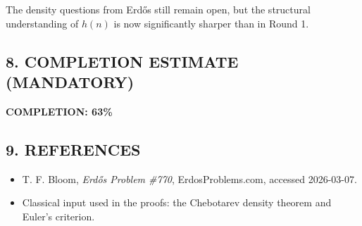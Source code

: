 The density questions from Erd\H{o}s still remain open, but the structural understanding of $h(n)$ is now significantly sharper than in Round 1.

\subsection*{8. COMPLETION ESTIMATE (MANDATORY)}

\textbf{COMPLETION: 63\%}

\subsection*{9. REFERENCES}

\begin{itemize}
\item T. F. Bloom, \emph{Erd\H{o}s Problem \#770}, ErdosProblems.com, accessed 2026-03-07.
\item Classical input used in the proofs: the Chebotarev density theorem and Euler's criterion.
\end{itemize}
